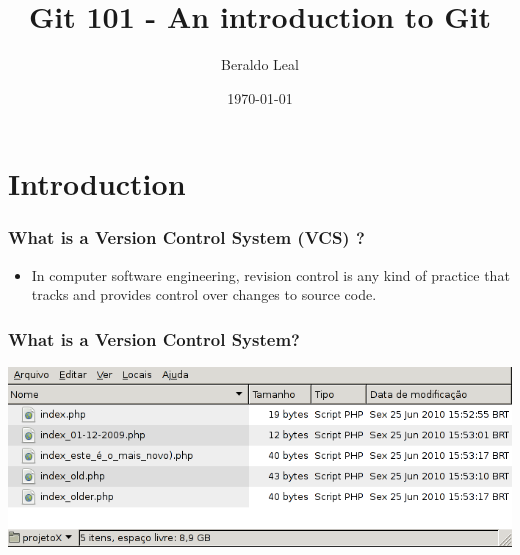 \documentclass{beamer}
\title[Git 101]{Git 101 - An introduction to Git} %
\author{Beraldo Leal} %
\institute[NCC/UNESP] %
{
Sao Paulo State University - UNESP \\ %
\medskip
\textit{beraldo@ncc.unesp.br} %
}
\date{\today} %
\begin{document}
\begin{frame}
\titlepage %
\end{frame}


\section{Introduction} %


\frame{\insertsection}

\begin{frame}
\frametitle{What is a Version Control System (VCS) ?}
\begin{itemize}
\item In computer software engineering, revision control is any kind of
practice that tracks and provides control over changes to source code.
\end{itemize}
\end{frame}

\begin{frame}
\frametitle{What is a Version Control System?}
  \includegraphics[width=1\textwidth]{imgs/01.png}
\end{frame}
\end{document}
